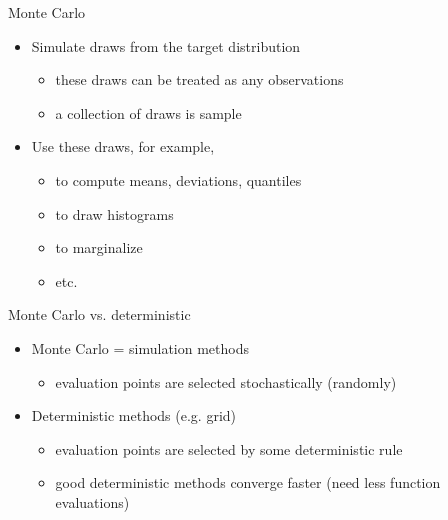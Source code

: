 \documentclass[finnish,english,t]{beamer}
\begin{document}

\begin{frame}{Monte Carlo}

  \begin{itemize}
  \item Simulate draws from the target distribution
    \begin{itemize}
    \item these draws can be treated as any observations
    \item a collection of draws is sample
    \end{itemize}
  \item Use these draws, for example,
    \begin{itemize}
    \item to compute means, deviations, quantiles
    \item to draw histograms
    \item to marginalize
    \item etc.
    \end{itemize}
  \end{itemize}

\end{frame}

\begin{frame}
{Monte Carlo vs. deterministic}

  \begin{itemize}
  \item Monte Carlo = simulation methods
    \begin{itemize}
    \item evaluation points are selected stochastically (randomly)
    \end{itemize}
  \item Deterministic methods (e.g. grid)
    \begin{itemize}
    \item evaluation points are selected by some deterministic rule
    \item good deterministic methods converge faster (need less function evaluations)
    \end{itemize}
  \end{itemize}

\end{frame}
\end{document}
